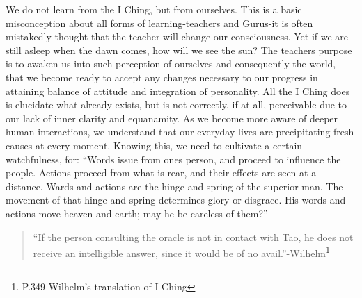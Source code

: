 \documentclass[11pt]{book}
\begin{document}
We do not learn from the I Ching, but from ourselves. This is a basic misconception about all forms of learning-teachers and Gurus-it is often mistakedly thought that the teacher will change our consciousness. Yet if we are still asleep when the dawn comes, how will we see the sun? The teachers purpose is to awaken us into such perception of ourselves and consequently the world, that we become ready to accept any changes necessary to our progress in attaining balance of attitude and integration of personality. All the I Ching does is elucidate what already exists, but is not correctly, if at all, perceivable due to our lack of inner clarity and equanamity. As we become more aware of deeper human interactions, we understand that our everyday lives are precipitating fresh causes at every moment. Knowing this, we need to cultivate a certain watchfulness, for: ``Words issue from ones person, and proceed to influence the people. Actions proceed from what is rear, and their effects are seen at a distance. Wards and actions are the hinge and spring of the superior man. The movement of that hinge and spring determines glory or disgrace. His words and actions move heaven and earth; may he be careless of them?''

\begin{quote}
``If the person consulting the oracle is not in contact with Tao, he does not receive an intelligible answer, since it would be of no avail.''-Wilhelm\footnote{P.349 Wilhelm's translation of I Ching}
\end{quote}
\end{document}

